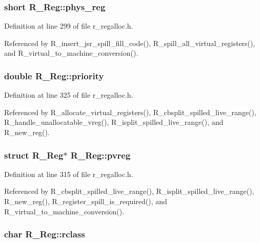 \subsubsection{\setlength{\rightskip}{0pt plus 5cm}short \bf{R\_\-Reg::phys\_\-reg}}\label{structR__Reg_d4e50211b7024bf2935519cda4f8f002}




Definition at line 299 of file r\_\-regalloc.h.

Referenced by R\_\-insert\_\-jsr\_\-spill\_\-fill\_\-code(), R\_\-spill\_\-all\_\-virtual\_\-registers(), and R\_\-virtual\_\-to\_\-machine\_\-conversion().
\subsubsection{\setlength{\rightskip}{0pt plus 5cm}double \bf{R\_\-Reg::priority}}\label{structR__Reg_a44167a0f0ea24e12947725556aaac62}




Definition at line 325 of file r\_\-regalloc.h.

Referenced by R\_\-allocate\_\-virtual\_\-registers(), R\_\-cbsplit\_\-spilled\_\-live\_\-range(), R\_\-handle\_\-unallocatable\_\-vreg(), R\_\-isplit\_\-spilled\_\-live\_\-range(), and R\_\-new\_\-reg().
\subsubsection{\setlength{\rightskip}{0pt plus 5cm}struct \bf{R\_\-Reg}$\ast$ \bf{R\_\-Reg::pvreg}}\label{structR__Reg_1d07069ab79410ca5e1f4d1fdcf358c5}




Definition at line 315 of file r\_\-regalloc.h.

Referenced by R\_\-cbsplit\_\-spilled\_\-live\_\-range(), R\_\-isplit\_\-spilled\_\-live\_\-range(), R\_\-new\_\-reg(), R\_\-register\_\-spill\_\-is\_\-required(), and R\_\-virtual\_\-to\_\-machine\_\-conversion().
\subsubsection{\setlength{\rightskip}{0pt plus 5cm}char \bf{R\_\-Reg::rclass}}\label{structR__Reg_3c60154df17cacf69359a1213d62ed62}




